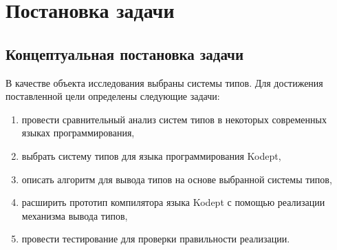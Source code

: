 \chapter{Постановка задачи}
\label{ch:task}


\section{Концептуальная постановка задачи}
\label{sec:abstract_task}

В качестве объекта исследования выбраны системы типов.
Для достижения поставленной цели определены следующие задачи:

\begin{enumerate}[1)]
    \item провести сравнительный анализ систем типов в некоторых современных языках программирования,
    \item выбрать систему типов для языка программирования Kodept,
    \item описать алгоритм для вывода типов на основе выбранной системы типов,
    \item расширить прототип компилятора языка Kodept с помощью реализации механизма вывода типов,
    \item провести тестирование для проверки правильности реализации.
\end{enumerate}

